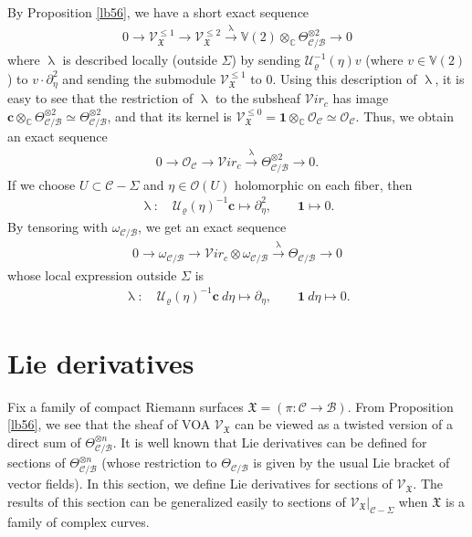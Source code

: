 \documentclass[12pt,a4paper,notitlepage]{report}
\theoremstyle{definition}
\theoremstyle{plain}
\newcommand{\fk}{\mathfrak}
\newcommand{\mc}{\mathcal}
\newcommand{\id}{\mathbf{1}}
\newcommand{\scr}{\mathscr}
\newcommand{\Vbb}{\mathbb V}
\newcommand{\Cbb}{\mathbb C}
\newcommand{\cbf}{\mathbf c}
\newcommand{\svir}{\mathcal V\!\mathit{ir}}
\numberwithin{equation}{section}
\begin{document}
By Proposition \ref{lb56}, we have a short exact sequence
\begin{align*}
0\rightarrow\scr V_{\fk X}^{\leq 1} \rightarrow\scr V_{\fk X}^{\leq 2}\xrightarrow{\uplambda}\Vbb(2)\otimes_\Cbb\Theta_{\mc C/\mc B}^{\otimes 2}\rightarrow 0
\end{align*}
where $\uplambda$ is described locally (outside $\Sigma$)  by sending  $\mc U_\varrho^{-1}(\eta)v$ (where $v\in\Vbb(2)$) to  $v\cdot \partial_\eta^2$ and sending the submodule $\scr V_{\fk X}^{\leq 1}$ to $0$. Using this description of $\uplambda$, it is easy to see that the restriction of $\uplambda$ to the subsheaf $\svir_c$ has image $\cbf\otimes_\Cbb \Theta_{\mc C/\mc B}^{\otimes 2}\simeq \Theta_{\mc C/\mc B}^{\otimes 2}$, and that its kernel is $\scr V_{\fk X}^{\leq 0}=\id\otimes_\Cbb\scr O_{\mc C}\simeq\scr O_{\mc C}$. Thus, we obtain an exact sequence
\begin{align}
0\rightarrow\scr O_{\mc C} \rightarrow\svir_c\xrightarrow{\uplambda}\Theta_{\mc C/\mc B}^{\otimes 2}\rightarrow 0.\label{eq168}
\end{align}
If we choose $U\subset\mc C-\Sigma$ and $\eta\in\scr O(U)$ holomorphic on each fiber,  then
\begin{gather*}
\uplambda:\quad \mc U_\varrho(\eta)^{-1}\cbf\mapsto \partial_\eta^2,\qquad \id\mapsto 0.
\end{gather*}
By tensoring with $\omega_{\mc C/\mc B}$, we get an exact sequence
\begin{gather}
0\rightarrow\omega_{\mc C/\mc B} \rightarrow\svir_c\otimes \omega_{\mc C/\mc B}\xrightarrow{\uplambda} \Theta_{\mc C/\mc B}\rightarrow 0\label{eq154}
\end{gather}
whose local expression outside $\Sigma$ is
\begin{gather}
\uplambda:\quad \mc U_\varrho(\eta)^{-1}\cbf ~d\eta\mapsto \partial_\eta,\qquad \id ~d\eta\mapsto 0.\label{eq155}
\end{gather}


 











\section{Lie derivatives}\label{lb50}



Fix a family of compact Riemann surfaces $\fk X=(\pi:\mc C\rightarrow\mc B)$. From Proposition \ref{lb56}, we see that the sheaf of VOA $\scr V_{\fk X}$ can be viewed as a twisted version of a direct sum of $\Theta_{\mc C/\mc B}^{\otimes n}$. It is well known that Lie derivatives can be defined for sections of $\Theta_{\mc C/\mc B}^{\otimes n}$ (whose restriction to $\Theta_{\mc C/\mc B}$ is given by the usual Lie bracket of vector fields). In this section, we define Lie derivatives for sections of $\scr V_{\fk X}$. The results of this section can be generalized easily to sections of $\scr V_{\fk X}|_{\mc C-\Sigma}$ when $\fk X$ is a family of complex curves.
\end{document}
